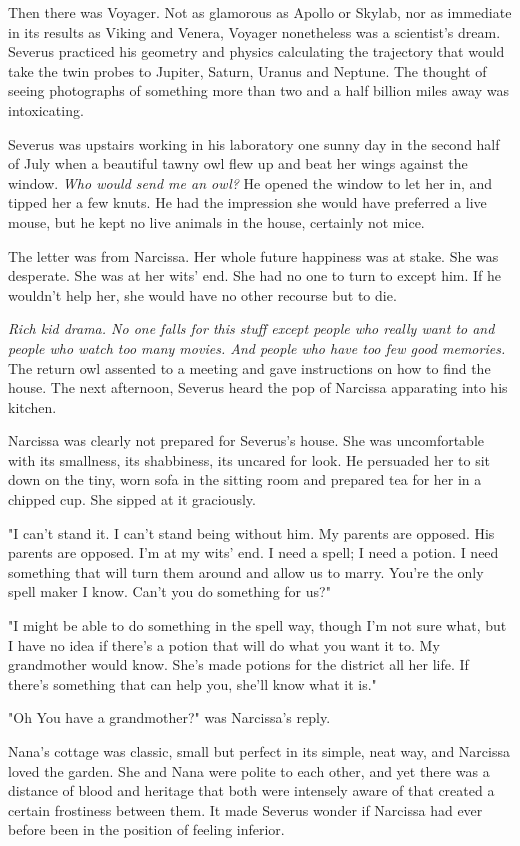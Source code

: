 Then there was Voyager. Not as glamorous as Apollo or Skylab, nor as immediate in its results as Viking and Venera, Voyager nonetheless was a scientist's dream. Severus practiced his geometry and physics calculating the trajectory that would take the twin probes to Jupiter, Saturn, Uranus and Neptune. The thought of seeing photographs of something more than two and a half billion miles away was intoxicating.

Severus was upstairs working in his laboratory one sunny day in the second half of July when a beautiful tawny owl flew up and beat her wings against the window. \emph{Who would send me an owl?} He opened the window to let her in, and tipped her a few knuts. He had the impression she would have preferred a live mouse, but he kept no live animals in the house, certainly not mice.

The letter was from Narcissa. Her whole future happiness was at stake. She was desperate. She was at her wits' end. She had no one to turn to except him. If he wouldn't help her, she would have no other recourse but to die.

\emph{Rich kid drama. No one falls for this stuff except people who really want to and people who watch too many movies. And people who have too few good memories.} The return owl assented to a meeting and gave instructions on how to find the house. The next afternoon, Severus heard the pop of Narcissa apparating into his kitchen.

Narcissa was clearly not prepared for Severus's house. She was uncomfortable with its smallness, its shabbiness, its uncared for look. He persuaded her to sit down on the tiny, worn sofa in the sitting room and prepared tea for her in a chipped cup. She sipped at it graciously.

"I can't stand it. I can't stand being without him. My parents are opposed. His parents are opposed. I'm at my wits' end. I need a spell; I need a potion. I need something that will turn them around and allow us to marry. You're the only spell maker I know. Can't you do something for us?"

"I might be able to do something in the spell way, though I'm not sure what, but I have no idea if there's a potion that will do what you want it to. My grandmother would know. She's made potions for the district all her life. If there's something that can help you, she'll know what it is."

"Oh{\el} You have a grandmother?" was Narcissa's reply.

Nana's cottage was classic, small but perfect in its simple, neat way, and Narcissa loved the garden. She and Nana were polite to each other, and yet there was a distance of blood and heritage that both were intensely aware of that created a certain frostiness between them. It made Severus wonder if Narcissa had ever before been in the position of feeling inferior.

